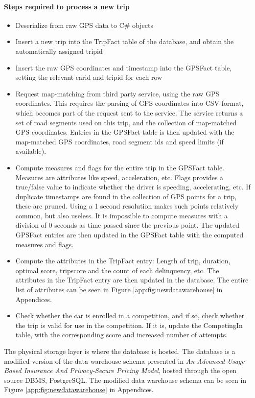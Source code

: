 \paragraph{Steps required to process a new trip}
\begin{itemize}
\item Deserialize from raw GPS data to C\# objects
\item Insert a new trip into the TripFact table of the database, and obtain the automatically assigned tripid
\item Insert the raw GPS coordinates and timestamp into the GPSFact table, setting the relevant carid and tripid for each row
\item Request map-matching from third party service, using the raw GPS coordinates\cite{trackmatch}. This requires the parsing of GPS coordinates into CSV-format, which becomes part of the request sent to the service. The service returns a set of road segments used on this trip, and the collection of map-matched GPS coordinates. Entries in the GPSFact table is then updated with the map-matched GPS coordinates, road segment ids and speed limits (if available).
\item Compute measures and flags for the entire trip in the GPSFact table. Measures are attributes like speed, acceleration, etc. Flags provides a true/false value to indicate whether the driver is speeding,  accelerating, etc. If duplicate timestamps are found in the collection of GPS points for a trip, these are pruned. Using a 1 second resolution makes such points relatively common, but also useless. It is impossible to compute measures with a division of 0 seconds as time passed since the previous point. The updated GPSFact entries are then updated in the GPSFact table with the computed measures and flags.
\item Compute the attributes in the TripFact entry: Length of trip, duration, optimal score, tripscore and the count of each delinquency, etc. The attributes in the TripFact entry are then updated in the database. The entire list of attributes can be seen in Figure \ref{app:fig:newdatawarehouse} in Appendices.
\item Check whether the car is enrolled in a competition, and if so, check whether the trip is valid for use in the competition. If it is, update the CompetingIn table, with the corresponding score and increased number of attempts. 
\end{itemize}

The physical storage layer is where the database is hosted. The database is a modified version of the data-warehouse schema presented in \textit{An Advanced Usage Based Insurance And Privacy-Secure Pricing Model}\cite{sw9_report}, hosted through the open source DBMS, PostgreSQL\cite{postgresql}. The modified data warehouse schema can be seen in Figure \ref{app:fig:newdatawarehouse} in Appendices.